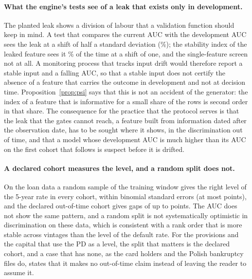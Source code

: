 \paragraph{What the engine's tests see of a leak that exists only in development.} The planted leak shows a division of labour that a validation function should keep in mind. A test that compares the current AUC with the development AUC sees the leak at a shift of half a standard deviation (\%); the stability index of the leaked feature sees it \% of the time at a shift of one, and the single-feature screen not at all. A monitoring process that tracks input drift would therefore report a stable input and a falling AUC, so that a stable input does not certify the absence of a feature that carries the outcome in development and not at decision time. Proposition~\ref{prop:psi} says that this is not an accident of the generator: the index of a feature that is informative for a small share of the rows is second order in that share. The consequence for the practice that the protocol serves is that the leak that the gates cannot reach, a feature built from information dated after the observation date, has to be sought where it shows, in the discrimination out of time, and that a model whose development AUC is much higher than its AUC on the first cohort that follows is suspect before it is drifted.

\paragraph{A declared cohort measures the level, and a random split does not.} On the loan data a random sample of the training window gives the right level of the 5-year rate in every cohort, within  binomial standard errors (at most  points), and the declared out-of-time cohort gives gaps of up to  points. The AUC does not show the same pattern, and a random split is not systematically optimistic in discrimination on these data, which is consistent with a rank order that is more stable across vintages than the level of the default rate. For the provisions and the capital that use the PD as a level, the split that matters is the declared cohort, and a case that has none, as the card holders and the Polish bankruptcy files do, states that it makes no out-of-time claim instead of leaving the reader to assume it.

